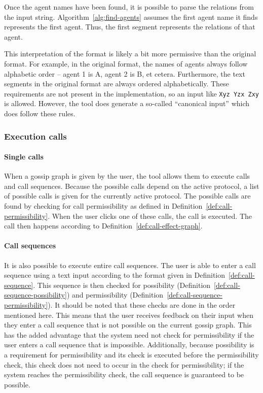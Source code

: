 Once the agent names have been found, it is possible to parse the relations from the input string.
Algorithm~\ref{alg:find-agents} assumes the first agent name it finds represents the first agent. 
Thus, the first segment represents the relations of that agent.


This interpretation of the format is likely a bit more permissive than the original format.
For example, in the original format, the names of agents always follow alphabetic order -- agent 1 is A, agent 2 is B, et cetera.
Furthermore, the text segments in the original format are always ordered alphabetically.
These requirements are not present in the implementation, so an input like \texttt{Xyz Yzx Zxy} is allowed.
However, the tool does generate a so-called ``canonical input'' which does follow these rules.


\subsubsection{Execution calls}

\paragraph{Single calls}
\label{sec:call-execution}
When a gossip graph is given by the user, the tool allows them to execute calls and call sequences. 
Because the possible calls depend on the active protocol,
a list of possible calls is given for the currently active protocol.
The possible calls are found by checking for call permissibility as defined in Definition~\ref{def:call-permissibility}.
When the user clicks one of these calls, the call is executed.
The call then happens according to Definition~\ref{def:call-effect-graph}.

\paragraph{Call sequences}
It is also possible to execute entire call sequences.
The user is able to enter a call sequence using a text input according to the format given in Definition~\ref{def:call-sequence}.
This sequence is then checked for possibility (Definition~\ref{def:call-sequence-possibility}) and permissibility (Definition~\ref{def:call-sequence-permissibility}).
It should be noted that these checks are done in the order mentioned here.
This means that the user receives feedback on their input when they enter a call sequence that is not possible on the current gossip graph.
This has the added advantage that the system need not check for permissibility if the user enters a call sequence that is impossible.
Additionally, because possibility is a requirement for permissibility and its check is executed before the permissibility check, this check does not need to occur in the check for permissibility;
if the system reaches the permissibility check, the call sequence is guaranteed to be possible.


